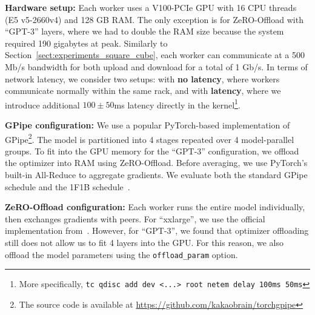 \textbf{Hardware setup:} Each worker uses a V100-PCIe GPU with 16 CPU threads (E5 v5-2660v4) and 128 GB RAM. The only exception is for ZeRO-Offload with ``GPT-3'' layers, where we had to double the RAM size because the system required 190 gigabytes at peak. Similarly to Section~\ref{sect:experiments_square_cube}, each worker can communicate at a 500 Mb/s bandwidth for both upload and download for a total of 1 Gb/s.
In terms of network latency, we consider two setups: with \textbf{no latency}, where workers communicate normally within the same rack, and with \textbf{latency}, where we introduce additional $100\pm50$ms latency directly in the kernel\footnote{More specifically, \texttt{tc qdisc add dev <...> root netem delay 100ms 50ms}}.

\textbf{GPipe configuration:} We use a popular PyTorch-based implementation of GPipe\footnote{The source code is available at \url{https://github.com/kakaobrain/torchgpipe}}. The model is partitioned into 4 stages repeated over 4 model-parallel groups. To fit into the GPU memory for the ``GPT-3'' configuration, we offload the optimizer into RAM using ZeRO-Offload. Before averaging, we use PyTorch's built-in All-Reduce to aggregate gradients.
We evaluate both the standard GPipe schedule and the 1F1B schedule~\citep{pipedream}.

\textbf{ZeRO-Offload configuration:} Each worker runs the entire model individually, then exchanges gradients with peers. For ``xxlarge'', we use the official implementation from~\cite{zerooffload}. However, for ``GPT-3'', we found that optimizer offloading still does not allow us to fit 4 layers into the GPU. For this reason, we also offload the model parameters using the \texttt{offload\_param} option.

